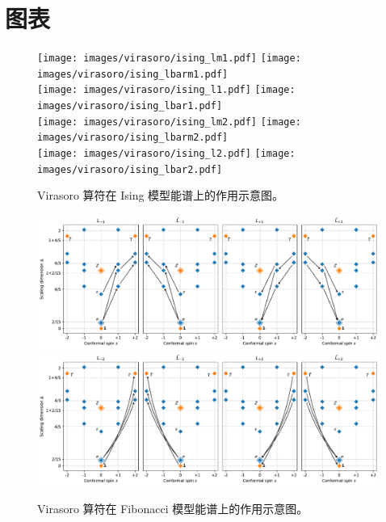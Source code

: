 \appendix

\chapter{图表}

\begin{figure}[ht]
  \vspace{-1.5cm}
  \centering
  \texttt{[image: images/virasoro/ising\_lm1.pdf]}    \quad
  \texttt{[image: images/virasoro/ising\_lbarm1.pdf]} \\
  \texttt{[image: images/virasoro/ising\_l1.pdf]}     \quad
  \texttt{[image: images/virasoro/ising\_lbar1.pdf]}  \\
  \texttt{[image: images/virasoro/ising\_lm2.pdf]}    \quad
  \texttt{[image: images/virasoro/ising\_lbarm2.pdf]} \\
  \texttt{[image: images/virasoro/ising\_l2.pdf]}     \quad
  \texttt{[image: images/virasoro/ising\_lbar2.pdf]}
  \caption[Virasoro 算符在 Ising 模型能谱上的作用示意图]{Virasoro 算符在 Ising 模型能谱上的作用示意图。}
  \label{fig:ising-virasoro-all}
\end{figure}

\begin{figure}[ht]
  \centering
  \includegraphics[width=\textwidth]{images/fibonacci/fib-virasoro-all-1.pdf} \\
  \includegraphics[width=\textwidth]{images/fibonacci/fib-virasoro-all-2.pdf}
  \caption[Virasoro 算符在 Fibonacci 模型能谱上的作用示意图]{Virasoro 算符在 Fibonacci 模型能谱上的作用示意图。}
  \label{fig:fib-virasoro-all}
\end{figure}

